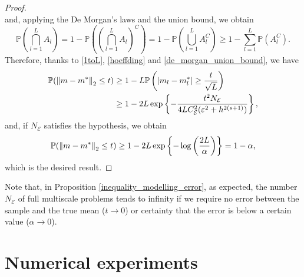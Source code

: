 \documentclass[10pt]{article}
\begin{document}
\begin{proof}
\begin{equation*}
\end{equation*}
and, applying the De Morgan's laws and the union bound, we obtain
\begin{equation}
\label{de_morgan_union_bound}
\mathbb{P}\left ( \bigcap_{l=1}^L A_l \right ) = 1 - \mathbb{P} \left ( \left ( \bigcap_{l=1}^L A_l \right )^C \right ) = 1 - \mathbb{P} \left ( \bigcup_{l=1}^L A_l^C \right ) \ge 1 - \sum_{l=1}^L \mathbb{P}(A_l^C).
\end{equation}
Therefore, thanks to \eqref{1toL}, \eqref{hoeffding} and \eqref{de_morgan_union_bound}, we have
\begin{align*}
\mathbb{P}( \left\|m - m^*\right\|_2 \le t ) \ge & \; 1 - L \mathbb{P} \left ( \left\lvert m_l - m^*_l\right\rvert \ge \frac{t}{\sqrt{L}} \right ) \\
\ge & \; 1 - 2L \exp \left \{ - \frac{t^2 N_{\mathcal{E}}}{4 L C_{\mathcal{E}}^2 (\varepsilon^2 + h^{2(s+1)})} \right \},
\end{align*}
and, if $N_{\mathcal{E}}$ satisfies the hypothesis, we obtain
\begin{equation*}
\mathbb{P}( \left\|m - m^*\right\|_2 \le t ) \ge 1 - 2L \exp \left \{ - \log \left ( \frac{2L}{\alpha} \right ) \right \} = 1 - \alpha,
\end{equation*}
which is the desired result.
\end{proof}

\begin{remark}
Note that, in Proposition \ref{inequality_modelling_error}, as expected, the number $N_{\mathcal{E}}$ of full multiscale problems tends to infinity if we require no error between the sample and the true mean ($t \to 0$) or certainty that the error is below a certain value ($\alpha \to 0$). 
\end{remark}

\section{Numerical experiments}\label{Experiments}
\end{document}
